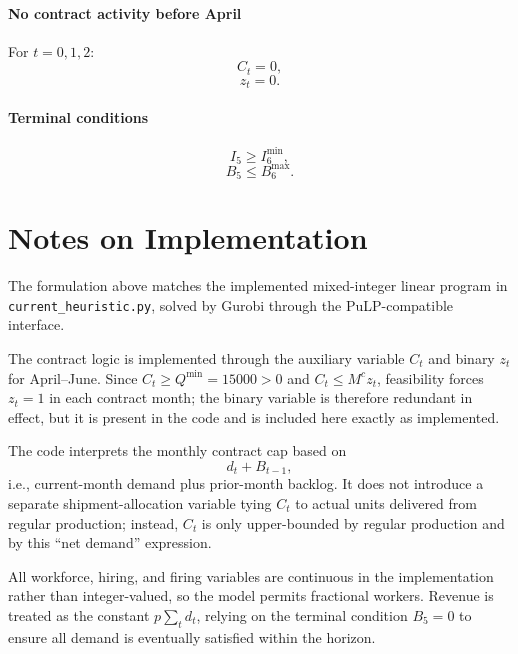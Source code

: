 \paragraph{No contract activity before April}
For \(t=0,1,2\):
\[
C_t = 0,
\]
\[
z_t = 0.
\]

\paragraph{Terminal conditions}
\[
I_5 \ge I^{\min}_{6},
\]
\[
B_5 \le B^{\max}_{6}.
\]

\section*{Notes on Implementation}

The formulation above matches the implemented mixed-integer linear program in \texttt{current\_heuristic.py}, solved by Gurobi through the PuLP-compatible interface.

The contract logic is implemented through the auxiliary variable \(C_t\) and binary \(z_t\) for April--June. Since \(C_t \ge Q^{\min}=15000>0\) and \(C_t \le M^c z_t\), feasibility forces \(z_t=1\) in each contract month; the binary variable is therefore redundant in effect, but it is present in the code and is included here exactly as implemented.

The code interprets the monthly contract cap based on
\[
d_t + B_{t-1},
\]
i.e., current-month demand plus prior-month backlog. It does not introduce a separate shipment-allocation variable tying \(C_t\) to actual units delivered from regular production; instead, \(C_t\) is only upper-bounded by regular production and by this ``net demand'' expression.

All workforce, hiring, and firing variables are continuous in the implementation rather than integer-valued, so the model permits fractional workers. Revenue is treated as the constant \(p\sum_t d_t\), relying on the terminal condition \(B_5=0\) to ensure all demand is eventually satisfied within the horizon.
